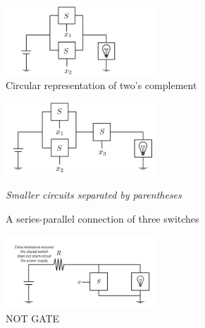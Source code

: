 \documentclass[12pt,openany, tikz,border=10pt]{book}
\begin{document}
			      	
			      	 
			      	
			      	\begin{figure}[htp] %
			      		\centering
			      		\includegraphics[width=0.5\textwidth]{circuits/6.1.3_2.png} %
			      		\caption*{Circular representation of two's complement}
			      	\end{figure}
			      	
			      	
			      	\begin{figure}[htp] %
			      		\centering
			      		\includegraphics[width=0.5\textwidth]{circuits/6.1.3_3.png} %
			      		\caption*{A series-parallel connection of three switches}
			      		 \newline
			      		\textit{Smaller circuits separated by parentheses}
			      	\end{figure}
			      	
			      	
			      	\begin{figure}[htp]
			      		\centering
			      		\includegraphics[width=0.5\textwidth]{circuits/6.1.3_4.png} %
			      		\caption*{NOT GATE} %
			      		\label{fig:notgate} %
			      		\medskip %
			      	\end{figure}
			      	\newpage
\end{document}
